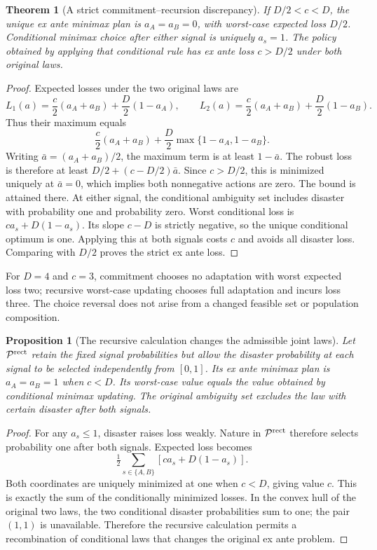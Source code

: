\documentclass[11pt]{article}
\newtheorem{theorem}{Theorem}
\newtheorem{proposition}{Proposition}
\theoremstyle{definition}
\begin{document}
\begin{theorem}[A strict commitment--recursion discrepancy]
If $D/2<c<D$, the unique ex ante minimax plan is $a_A=a_B=0$, with worst-case expected loss $D/2$. Conditional minimax choice after either signal is uniquely $a_s=1$. The policy obtained by applying that conditional rule has ex ante loss $c>D/2$ under both original laws.
\end{theorem}
\begin{proof}
Expected losses under the two original laws are
\[
 L_1(a)=\frac c2(a_A+a_B)+\frac D2(1-a_A),\qquad
 L_2(a)=\frac c2(a_A+a_B)+\frac D2(1-a_B).
\]
Thus their maximum equals
\[
 \frac c2(a_A+a_B)+\frac D2\max\{1-a_A,1-a_B\}.
\]
Writing $\bar a=(a_A+a_B)/2$, the maximum term is at least $1-\bar a$. The robust loss is therefore at least $D/2+(c-D/2)\bar a$. Since $c>D/2$, this is minimized uniquely at $\bar a=0$, which implies both nonnegative actions are zero. The bound is attained there.
At either signal, the conditional ambiguity set includes disaster with probability one and probability zero. Worst conditional loss is $ca_s+D(1-a_s)$. Its slope $c-D$ is strictly negative, so the unique conditional optimum is one. Applying this at both signals costs $c$ and avoids all disaster loss. Comparing with $D/2$ proves the strict ex ante loss.
\end{proof}
For $D=4$ and $c=3$, commitment chooses no adaptation with worst expected loss two; recursive worst-case updating chooses full adaptation and incurs loss three. The choice reversal does not arise from a changed feasible set or population composition.

\begin{proposition}[The recursive calculation changes the admissible joint laws]
Let $\mathcal P^{\rm rect}$ retain the fixed signal probabilities but allow the disaster probability at each signal to be selected independently from $[0,1]$. Its ex ante minimax plan is $a_A=a_B=1$ when $c<D$. Its worst-case value equals the value obtained by conditional minimax updating. The original ambiguity set excludes the law with certain disaster after both signals.
\end{proposition}
\begin{proof}
For any $a_s\leq1$, disaster raises loss weakly. Nature in $\mathcal P^{\rm rect}$ therefore selects probability one after both signals. Expected loss becomes
\[
 \tfrac12\sum_{s\in\{A,B\}}[ca_s+D(1-a_s)].
\]
Both coordinates are uniquely minimized at one when $c<D$, giving value $c$. This is exactly the sum of the conditionally minimized losses. In the convex hull of the original two laws, the two conditional disaster probabilities sum to one; the pair $(1,1)$ is unavailable. Therefore the recursive calculation permits a recombination of conditional laws that changes the original ex ante problem.
\end{proof}
\end{document}

